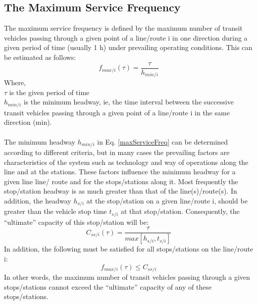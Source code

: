 \subsection{The Maximum Service Frequency}
The maximum service frequency is defined by the maximum number of transit vehicles passing through a given point of a line/route i in one direction during a given period of time (usually 1 h) under prevailing operating conditions. This can be estimated as follows:
\begin{equation}
	\label{maxServiceFreq}
	f_{max/i}(\tau) = \frac{\tau}{h_{min/i}}
\end{equation}
Where,\\
\hspace*{10mm} $\tau$ is the given period of time\\
\hspace*{10mm} $h_{min/i}$ is the minimum headway, ie, the time interval between the successive transit vehicles passing through a given point of a line/route i in the same direction (min).\\\\
The minimum headway $ h_{min/i} $ in Eq. \ref{maxServiceFreq} can be determined according to different criteria, but in many cases the prevailing factors are characteristics of the system such as technology and way of operations along the line and at the stations. These factors influence the minimum headway for a given line line/ route and for the stops/stations along it. Most frequently the stop/station headway is as much greater than that of the line(s)/route(s). In addition, the headway $ h_{s/i} $ at the stop/station on a given line/route i, should be greater than the vehicle stop time $ t_{s/i} $ at that stop/station. Consequently, the “ultimate” capacity of this stop/station will be:
\begin{equation}
	C_{ss/i}(\tau) = \frac{\tau}{max[h_{s/i}, t_{s/i}]}
\end{equation}
In addition, the following must be satisfied for all stops/stations on the line/route i:
\begin{equation}
	f_{max/i}(\tau) \leq C_{ss/i}
\end{equation}
In other words, the maximum number of transit vehicles passing through a given stops/stations cannot exceed the “ultimate” capacity of any of these stops/stations.
%
